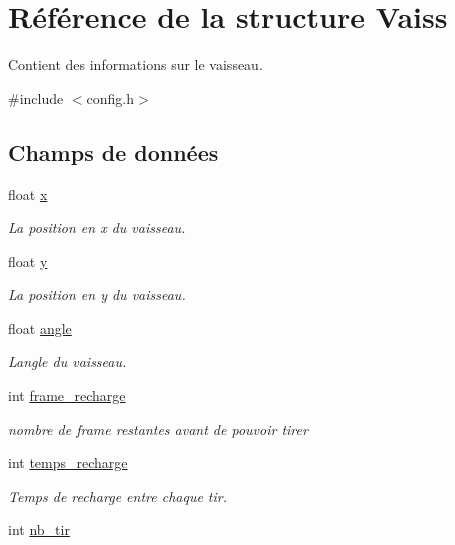 \hypertarget{struct_vaiss}{}\section{Référence de la structure Vaiss}
\label{struct_vaiss}


Contient des informations sur le vaisseau.  




{\ttfamily \#include $<$config.\+h$>$}

\subsection*{Champs de données}
\begin{DoxyCompactItemize}
\item 
float \hyperlink{struct_vaiss_adf25c355add352aee76780722e5c4435}{x}
\begin{DoxyCompactList}\small\item\em La position en x du vaisseau. \end{DoxyCompactList}\item 
float \hyperlink{struct_vaiss_a6b9897f16bb39baba8b2e2a30ca405f9}{y}
\begin{DoxyCompactList}\small\item\em La position en y du vaisseau. \end{DoxyCompactList}\item 
float \hyperlink{struct_vaiss_a825b3dfd9664c59cdedcb03c868c23df}{angle}
\begin{DoxyCompactList}\small\item\em L\textquotesingle{}angle du vaisseau\textquotesingle{}. \end{DoxyCompactList}\item 
int \hyperlink{struct_vaiss_a056dad119b938ab8acc9c28190ec2f71}{frame\+\_\+recharge}
\begin{DoxyCompactList}\small\item\em nombre de frame restantes avant de pouvoir tirer \end{DoxyCompactList}\item 
int \hyperlink{struct_vaiss_a7a103cbc9f22117c77b40d6dd44a2015}{temps\+\_\+recharge}
\begin{DoxyCompactList}\small\item\em Temps de recharge entre chaque tir. \end{DoxyCompactList}\item 
int \hyperlink{struct_vaiss_ad63f9e2775f24575e22ba800714c36be}{nb\+\_\+tir}

\end{DoxyCompactItemize}
